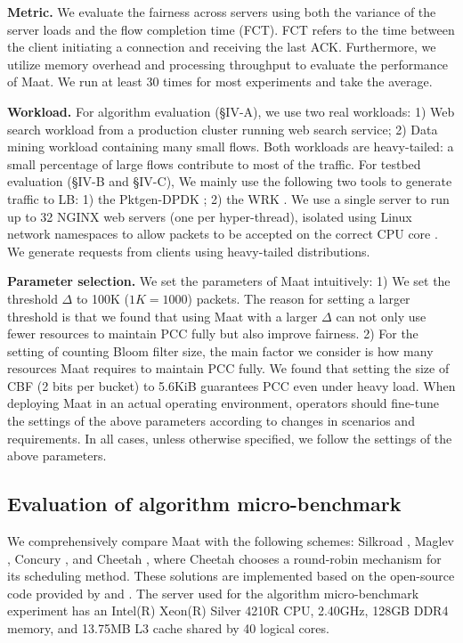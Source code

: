 \textbf{Metric.} We evaluate the fairness across servers using both the variance of the server loads and the flow completion time (FCT). FCT refers to the time between the client initiating a connection and receiving the last ACK. Furthermore, we utilize memory overhead and processing throughput to evaluate the performance of Maat. We run at least 30 times for most experiments and take the average.

\textbf{Workload.} For algorithm evaluation (\S IV-A), we use two real workloads: 1) Web search workload \cite{alizadeh2010data} from a production cluster running web search service; 2) Data mining workload \cite{montazeri2018homa} containing many small flows. Both workloads are heavy-tailed: a small percentage of large flows contribute to most of the traffic. For testbed evaluation (\S IV-B and \S IV-C), We mainly use the following two tools to generate traffic to LB: 1) the  Pktgen-DPDK \cite{pktgenDPDK}; 2) the WRK \cite{glozer2020wrk}. We use a single server to run up to 32 NGINX web servers (one per hyper-thread), isolated using Linux network namespaces to allow packets to be accepted on the correct CPU core \cite{barbette2021cheetah}. We generate requests from clients using heavy-tailed distributions.

\textbf{Parameter selection.} We set the parameters of Maat intuitively: 1) We set the threshold $\Delta$ to 100K ($1K=1000$) packets. The reason for setting a larger threshold is that we found that using Maat with a larger $\Delta$ can not only use fewer resources to maintain PCC fully but also improve fairness. 2) For the setting of counting Bloom filter size, the main factor we consider is how many resources Maat requires to maintain PCC fully. We found that setting the size of CBF (2 bits per bucket) to 5.6KiB guarantees PCC even under heavy load. When deploying Maat in an actual operating environment, operators should fine-tune the settings of the above parameters according to changes in scenarios and requirements. In all cases, unless otherwise specified, we follow the settings of the above parameters.

\subsection{Evaluation of algorithm micro-benchmark}
 We comprehensively compare Maat with the following schemes: Silkroad \cite{miao2017silkroad}, Maglev \cite{eisenbud2016maglev}, Concury \cite{shi2020concury}, and Cheetah \cite{barbette2021cheetah}, where Cheetah chooses a round-robin mechanism for its scheduling method. These solutions are implemented based on the open-source code provided by \cite{cheetah} and \cite{concury2019}. The server used for the algorithm micro-benchmark experiment has an Intel(R) Xeon(R) Silver 4210R CPU, 2.40GHz, 128GB DDR4 memory, and 13.75MB L3 cache shared by 40 logical cores.
 

